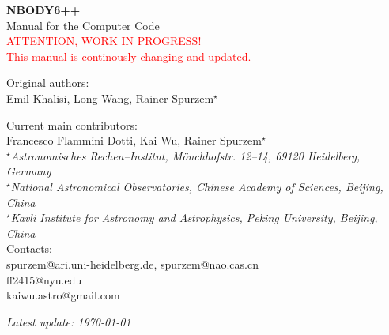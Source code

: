 

\thispagestyle{empty}

\vspace{1cm}
\begin{center}
{\Huge \bf NBODY6++}\\[0.7cm]
{\Huge  Manual for the Computer Code}\\[0.5cm]
{\Large \textcolor{red}{ATTENTION, WORK IN PROGRESS!\\[0.5cm]
This manual is continously changing and updated.}} \\ 
\end{center}



\vspace{1cm}
\noindent
%
\begin{center}
{\Large Original authors:\\
Emil Khalisi, Long Wang, Rainer Spurzem$^\star$ \\[1ex]
}

{\Large Current main contributors:\\
Francesco Flammini Dotti, Kai Wu, Rainer Spurzem$^\star$ \\[1ex]
}
{\it
$^\star$Astronomisches Rechen--Institut,
M\"onchhofstr. 12--14, 69120 Heidelberg, Germany \\
$^\star$National Astronomical Observatories,  Chinese Academy of Sciences, Beijing, China\\
$^\star$Kavli Institute for Astronomy and Astrophysics,
Peking University, Beijing, China
}\\[1ex]
Contacts:\\
spurzem@ari.uni-heidelberg.de, spurzem@nao.cas.cn \\
ff2415@nyu.edu \\ kaiwu.astro@gmail.com
\end{center}



\noindent
\begin{figure}[bh]
  \centering
\end{figure}

\noindent
%
\begin{center}

{\it Latest update: \today}
\end{center}
\noindent

\setlength{\headheight}{13.6pt}
\addtolength{\topmargin}{-1.59999pt}

\cleardoublepage


